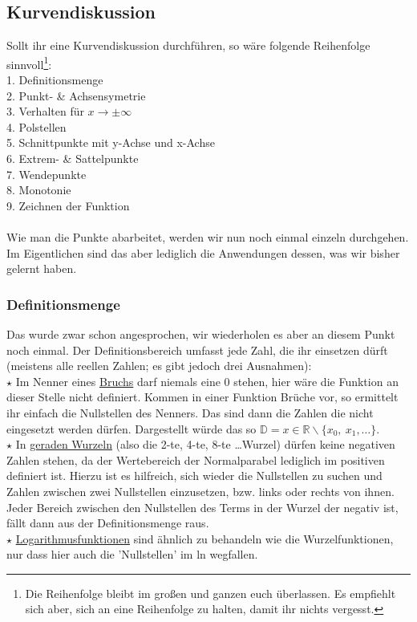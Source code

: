 \subsection{Kurvendiskussion}
Sollt ihr eine Kurvendiskussion durchführen, so wäre folgende Reihenfolge sinnvoll\footnote{Die Reihenfolge bleibt im großen und ganzen euch überlassen. Es empfiehlt sich aber, sich an eine Reihenfolge zu halten, damit ihr nichts vergesst.}:\\
1. Definitionsmenge\\
2. Punkt- \& Achsensymetrie\\
3. Verhalten für \(x \rightarrow \pm \infty\)\\
4. Polstellen\\
5. Schnittpunkte mit y-Achse und x-Achse\\
6. Extrem- \& Sattelpunkte\\
7. Wendepunkte\\
8. Monotonie\\
9. Zeichnen der Funktion\\ \\
Wie man die Punkte abarbeitet, werden wir nun noch einmal einzeln durchgehen. Im Eigentlichen sind das aber lediglich die Anwendungen dessen, was wir bisher gelernt haben.
\subsubsection{Definitionsmenge}
Das wurde zwar schon angesprochen, wir wiederholen es aber an diesem Punkt noch einmal. Der Definitionsbereich umfasst jede Zahl, die ihr einsetzen dürft (meistens alle reellen Zahlen; es gibt jedoch drei Ausnahmen):\\
\(\star\) Im Nenner eines \underline{Bruchs} darf niemals eine 0 stehen, hier wäre die Funktion an dieser Stelle nicht definiert. Kommen in einer Funktion Brüche vor, so ermittelt ihr einfach die Nullstellen des Nenners. Das sind dann die Zahlen die nicht eingesetzt werden dürfen. Dargestellt würde das so \(\mathbb D = x \in \mathbb R \backslash\{x_0,\ x_1, \ldots \}\).\\
\(\star\) In \underline{geraden Wurzeln} (also die 2-te, 4-te, 8-te \ldots Wurzel) dürfen keine negativen Zahlen stehen, da der Wertebereich der Normalparabel lediglich im positiven definiert ist. Hierzu ist es hilfreich, sich wieder die Nullstellen zu suchen und Zahlen zwischen zwei Nullstellen einzusetzen, bzw. links oder rechts von ihnen. Jeder Bereich zwischen den Nullstellen des Terms in der Wurzel der negativ ist, fällt dann aus der Definitionsmenge raus.\\
\(\star\) \underline{Logarithmusfunktionen} sind ähnlich zu behandeln wie die Wurzelfunktionen, nur dass hier auch die 'Nullstellen' im ln wegfallen.
